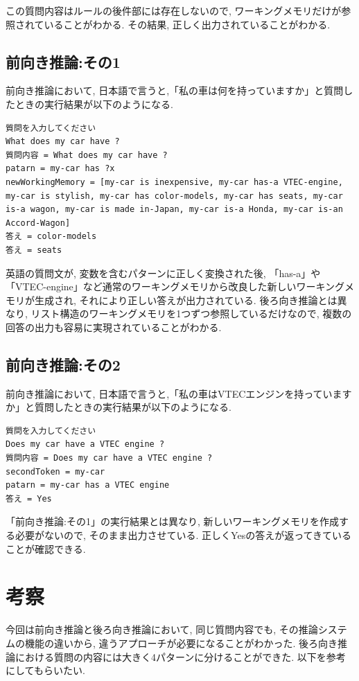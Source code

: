 \documentclass[uplatex,12pt]{jsarticle}
\begin{document}
この質問内容はルールの後件部には存在しないので, ワーキングメモリだけが参照されていることがわかる. その結果, 正しく出力されていることがわかる.

\subsection{前向き推論:その1}
前向き推論において, 日本語で言うと,「私の車は何を持っていますか」と質問したときの実行結果が以下のようになる.
\begin{lstlisting}
質問を入力してください
What does my car have ?
質問内容 = What does my car have ?
patarn = my-car has ?x
newWorkingMemory = [my-car is inexpensive, my-car has-a VTEC-engine, my-car is stylish, my-car has color-models, my-car has seats, my-car is-a wagon, my-car is made in-Japan, my-car is-a Honda, my-car is-an Accord-Wagon]
答え = color-models
答え = seats
\end{lstlisting}
英語の質問文が, 変数を含むパターンに正しく変換された後, 「has-a」や「VTEC-engine」など通常のワーキングメモリから改良した新しいワーキングメモリが生成され, それにより正しい答えが出力されている. 後ろ向き推論とは異なり, リスト構造のワーキングメモリを1つずつ参照しているだけなので, 複数の回答の出力も容易に実現されていることがわかる. 

\subsection{前向き推論:その2}
前向き推論において, 日本語で言うと,「私の車はVTECエンジンを持っていますか」と質問したときの実行結果が以下のようになる.
\begin{lstlisting}
質問を入力してください
Does my car have a VTEC engine ?
質問内容 = Does my car have a VTEC engine ?
secondToken = my-car
patarn = my-car has a VTEC engine
答え = Yes
\end{lstlisting}
「前向き推論:その1」の実行結果とは異なり, 新しいワーキングメモリを作成する必要がないので, そのまま出力させている. 正しくYesの答えが返ってきていることが確認できる.

\section{考察}
今回は前向き推論と後ろ向き推論において, 同じ質問内容でも, その推論システムの機能の違いから, 違うアプローチが必要になることがわかった. 後ろ向き推論における質問の内容には大きく4パターンに分けることができた. 以下を参考にしてもらいたい.
\end{document}
